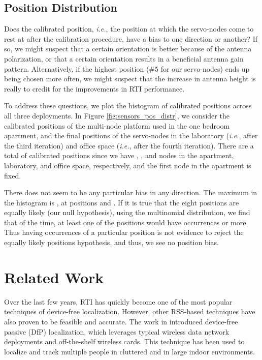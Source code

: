 \documentclass[conference]{IEEEtran}
\begin{document}
\subsection{Position Distribution}

Does the calibrated position, \emph{i.e.}, the position at which the servo-nodes come to rest at after the calibration procedure, have a bias to one direction or another?  If so, we might suspect that a certain orientation is better because of the antenna polarization, or that a certain orientation results in a beneficial antenna gain pattern.  Alternatively, if the highest position (\#5 for our servo-nodes) ends up being chosen more often, we might suspect that the increase in antenna height is really to credit for the improvements in RTI performance. 

To address these questions, we plot the histogram of calibrated positions across all three deployments. In Figure \ref{fig:sensors_pos_distr}, we consider the calibrated positions of the multi-node platform used in the one bedroom apartment, and the final positions of the servo-nodes in the laboratory (\emph{i.e.}, after the third iteration) and office space (\emph{i.e.}, after the fourth iteration). There are a total of  calibrated positions since we have , , and  nodes in the apartment, laboratory, and office space, respectively, and the first node in the apartment is fixed.  

There does not seem to be any particular bias in any direction.  The maximum in the histogram is , at positions  and .  If it is true that the eight positions are equally likely (our null hypothesis), using the multinomial distribution, we find that  of the time, at least one of the positions would have  occurrences or more.  Thus having  occurrences of a particular position is not evidence to reject the equally likely positions hypothesis, and thus, we see no position bias.







\section{Related Work}
\label{sec:related_work}

Over the last few years, RTI has quickly become one of the most popular techniques of device-free localization. However, other RSS-based techniques have also proven to be feasible and accurate. The work in \cite{youssef07} introduced device-free passive (DfP) localization, which leverages typical wireless data network deployments and off-the-shelf wireless cards. This technique has been used to localize and track multiple people in cluttered \cite{SPOT_Youssef} and in large \cite{Nuzzer_Youssef} indoor environments.
\end{document}

